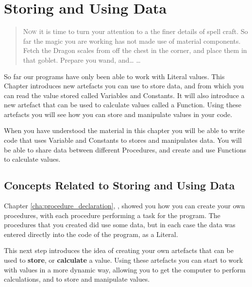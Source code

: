 \chapter{Storing and Using Data} %
\label{cha:storing_and_using_data}

\begin{quote}
  \Fontlukas\Large
  \renewcommand{\LettrineTextFont}{\relax}
  \lettrine[image=true,lines=3,lraise=0.1]
  {N}{ow} it is time to turn your attention to a the finer details of spell craft. So far the magic you are working has not made use of material components. Fetch the Dragon scales from off the chest in the corner, and place them in that goblet. Prepare you wand, and\ldots
  \ldots
\end{quote}

\bigskip


So far our programs have only been able to work with Literal values. This Chapter introduces new artefacts you can use to store data, and from which you can read the value stored called Variables and Constants. It will also introduce a new artefact that can be used to calculate values called a Function. Using these artefacts you will see how you can store and manipulate values in your code.

When you have understood the material in this chapter you will be able to write code that uses Variable and Constants to stores and manipulates data. You will be able to share data between different Procedures, and create and use Functions to calculate values.

\minitoc


\clearpage
\section{Concepts Related to Storing and Using Data} %
\label{sec:concepts_related_to_storing_and_using_data}

Chapter \ref{cha:procedure_declaration}, , showed you how you can create your own procedures, with each procedure performing a task for the program. The procedures that you created did use some data, but in each case the data was entered directly into the code of the program, as a Literal.

This next step introduces the idea of creating your own artefacts that can be used to \textbf{store}, or \textbf{calculate} a value. Using these artefacts you can start to work with values in a more dynamic way, allowing you to get the computer to perform calculations, and to store and manipulate values.

